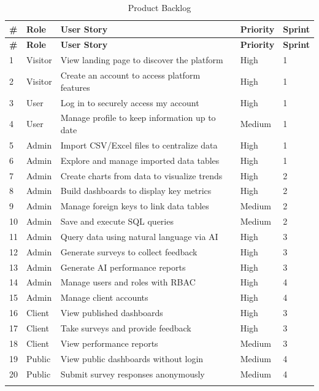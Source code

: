 \documentclass[12pt,a4paper]{report}
\begin{document}
\begin{table}[H]\begin{tabular}{|p{0.5cm}|p{2.5cm}|p{4cm}|p{1cm}|p{1.5cm}|}
\hline
\textbf{\#} & \textbf{Role} & \textbf{User Story} & \textbf{Priority} & \textbf{Sprint} \\
\hline

\hline
\textbf{\#} & \textbf{Role} & \textbf{User Story} & \textbf{Priority} & \textbf{Sprint} \\
\hline

1 & Visitor & View landing page to discover the platform & High & 1 \\
2 & Visitor & Create an account to access platform features & High & 1 \\
3 & User & Log in to securely access my account & High & 1 \\
4 & User & Manage profile to keep information up to date & Medium & 1 \\
5 & Admin & Import CSV/Excel files to centralize data & High & 1 \\
6 & Admin & Explore and manage imported data tables & High & 1 \\
7 & Admin & Create charts from data to visualize trends & High & 2 \\
8 & Admin & Build dashboards to display key metrics & High & 2 \\
9 & Admin & Manage foreign keys to link data tables & Medium & 2 \\
10 & Admin & Save and execute SQL queries & Medium & 2 \\
11 & Admin & Query data using natural language via AI & High & 3 \\
12 & Admin & Generate surveys to collect feedback & High & 3 \\
13 & Admin & Generate AI performance reports & High & 3 \\
14 & Admin & Manage users and roles with RBAC & High & 4 \\
15 & Admin & Manage client accounts & High & 4 \\
16 & Client & View published dashboards & High & 3 \\
17 & Client & Take surveys and provide feedback & High & 3 \\
18 & Client & View performance reports & Medium & 3 \\
19 & Public & View public dashboards without login & Medium & 4 \\
20 & Public & Submit survey responses anonymously & Medium & 4 \\
\hline
\caption{Product Backlog}
\end{tabular}\end{table}
\end{document}
